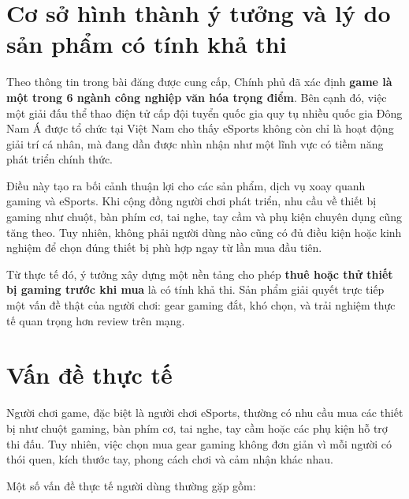 \section{Cơ sở hình thành ý tưởng và lý do sản phẩm có tính khả thi}

Theo thông tin trong bài đăng được cung cấp, Chính phủ đã xác định \textbf{game là một trong 6 ngành công nghiệp văn hóa trọng điểm}. Bên cạnh đó, việc một giải đấu thể thao điện tử cấp đội tuyển quốc gia quy tụ nhiều quốc gia Đông Nam Á được tổ chức tại Việt Nam cho thấy eSports không còn chỉ là hoạt động giải trí cá nhân, mà đang dần được nhìn nhận như một lĩnh vực có tiềm năng phát triển chính thức.

Điều này tạo ra bối cảnh thuận lợi cho các sản phẩm, dịch vụ xoay quanh gaming và eSports. Khi cộng đồng người chơi phát triển, nhu cầu về thiết bị gaming như chuột, bàn phím cơ, tai nghe, tay cầm và phụ kiện chuyên dụng cũng tăng theo. Tuy nhiên, không phải người dùng nào cũng có đủ điều kiện hoặc kinh nghiệm để chọn đúng thiết bị phù hợp ngay từ lần mua đầu tiên.

Từ thực tế đó, ý tưởng xây dựng một nền tảng cho phép \textbf{thuê hoặc thử thiết bị gaming trước khi mua} là có tính khả thi. Sản phẩm giải quyết trực tiếp một vấn đề thật của người chơi: gear gaming đắt, khó chọn, và trải nghiệm thực tế quan trọng hơn review trên mạng.

\section{Vấn đề thực tế}

Người chơi game, đặc biệt là người chơi eSports, thường có nhu cầu mua các thiết bị như chuột gaming, bàn phím cơ, tai nghe, tay cầm hoặc các phụ kiện hỗ trợ thi đấu. Tuy nhiên, việc chọn mua gear gaming không đơn giản vì mỗi người có thói quen, kích thước tay, phong cách chơi và cảm nhận khác nhau.

Một số vấn đề thực tế người dùng thường gặp gồm:

